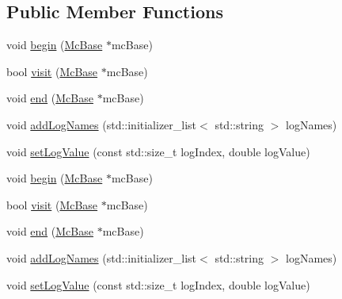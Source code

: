 \subsection*{Public Member Functions}
\begin{DoxyCompactItemize}
\item 
void \hyperlink{classnifty_1_1graph_1_1opt_1_1multicut_1_1PyMulticutVisitorBase_a4c31ac6a81426f9da50d75bd6af9fc06}{begin} (\hyperlink{classnifty_1_1graph_1_1opt_1_1multicut_1_1PyMulticutVisitorBase_aa6d9f36fb629bf51dadbc1018595cb14}{Mc\+Base} $\ast$mc\+Base)
\item 
bool \hyperlink{classnifty_1_1graph_1_1opt_1_1multicut_1_1PyMulticutVisitorBase_a8cf6b53826b99b40dd5bf2734e04ea57}{visit} (\hyperlink{classnifty_1_1graph_1_1opt_1_1multicut_1_1PyMulticutVisitorBase_aa6d9f36fb629bf51dadbc1018595cb14}{Mc\+Base} $\ast$mc\+Base)
\item 
void \hyperlink{classnifty_1_1graph_1_1opt_1_1multicut_1_1PyMulticutVisitorBase_acbe660f5feb2f3d62dbac1ecf7728fc3}{end} (\hyperlink{classnifty_1_1graph_1_1opt_1_1multicut_1_1PyMulticutVisitorBase_aa6d9f36fb629bf51dadbc1018595cb14}{Mc\+Base} $\ast$mc\+Base)
\item 
void \hyperlink{classnifty_1_1graph_1_1opt_1_1multicut_1_1PyMulticutVisitorBase_a6b6922de3a94d5c872ecfff2a845a03b}{add\+Log\+Names} (std\+::initializer\+\_\+list$<$ std\+::string $>$ log\+Names)
\item 
void \hyperlink{classnifty_1_1graph_1_1opt_1_1multicut_1_1PyMulticutVisitorBase_a7235408f664ec8fdc9e80f56b83424c4}{set\+Log\+Value} (const std\+::size\+\_\+t log\+Index, double log\+Value)
\item 
void \hyperlink{classnifty_1_1graph_1_1opt_1_1multicut_1_1PyMulticutVisitorBase_a4c31ac6a81426f9da50d75bd6af9fc06}{begin} (\hyperlink{classnifty_1_1graph_1_1opt_1_1multicut_1_1PyMulticutVisitorBase_aa6d9f36fb629bf51dadbc1018595cb14}{Mc\+Base} $\ast$mc\+Base)
\item 
bool \hyperlink{classnifty_1_1graph_1_1opt_1_1multicut_1_1PyMulticutVisitorBase_a8cf6b53826b99b40dd5bf2734e04ea57}{visit} (\hyperlink{classnifty_1_1graph_1_1opt_1_1multicut_1_1PyMulticutVisitorBase_aa6d9f36fb629bf51dadbc1018595cb14}{Mc\+Base} $\ast$mc\+Base)
\item 
void \hyperlink{classnifty_1_1graph_1_1opt_1_1multicut_1_1PyMulticutVisitorBase_acbe660f5feb2f3d62dbac1ecf7728fc3}{end} (\hyperlink{classnifty_1_1graph_1_1opt_1_1multicut_1_1PyMulticutVisitorBase_aa6d9f36fb629bf51dadbc1018595cb14}{Mc\+Base} $\ast$mc\+Base)
\item 
void \hyperlink{classnifty_1_1graph_1_1opt_1_1multicut_1_1PyMulticutVisitorBase_a6b6922de3a94d5c872ecfff2a845a03b}{add\+Log\+Names} (std\+::initializer\+\_\+list$<$ std\+::string $>$ log\+Names)
\item 
void \hyperlink{classnifty_1_1graph_1_1opt_1_1multicut_1_1PyMulticutVisitorBase_a7235408f664ec8fdc9e80f56b83424c4}{set\+Log\+Value} (const std\+::size\+\_\+t log\+Index, double log\+Value)
\end{DoxyCompactItemize}


